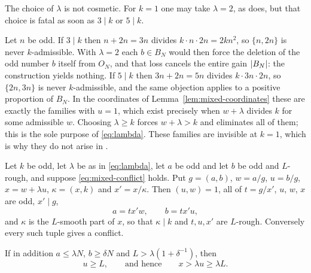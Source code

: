 \documentclass[11pt]{article}
\begin{document}
The choice of \(\lambda\) is not cosmetic. For \(k=1\) one may take
\(\lambda=2\), as \cite{DellaPietra2026} does, but that choice is fatal as
soon as \(3\mid k\) or \(5\mid k\).

\begin{remark}[why \(\lambda=2\) fails]\label{rem:lambda-two}
Let \(n\) be odd. If \(3\mid k\) then \(n+2n=3n\) divides
\(k\cdot n\cdot 2n=2kn^2\), so \(\{n,2n\}\) is never \(k\)-admissible. With
\(\lambda=2\) each \(b\in B_N\) would then force the deletion of the odd
number \(b\) itself from \(O_N\), and that loss cancels the entire gain
\(\left|B_N\right|\): the construction yields nothing. If \(5\mid k\) then
\(3n+2n=5n\) divides \(k\cdot3n\cdot2n\), so \(\{2n,3n\}\) is never
\(k\)-admissible, and the same objection applies to a positive proportion of
\(B_N\). In the coordinates of Lemma~\ref{lem:mixed-coordinates} these are
exactly the families with \(u=1\), which exist precisely when \(w+\lambda\)
divides \(k\) for some admissible \(w\). Choosing \(\lambda\geq k\) forces
\(w+\lambda>k\) and eliminates all of them; this is the sole purpose of
\eqref{eq:lambda}. These families are invisible at \(k=1\), which is why they
do not arise in \cite{DellaPietra2026}.
\end{remark}

\begin{lemma}\label{lem:mixed-coordinates}
Let \(k\) be odd, let \(\lambda\) be as in \eqref{eq:lambda}, let \(a\) be odd
and let \(b\) be odd and \(L\)-rough, and suppose \eqref{eq:mixed-conflict}
holds. Put \(g=(a,b)\), \(w=a/g\), \(u=b/g\), \(x=w+\lambda u\),
\(\kappa=(x,k)\) and \(x'=x/\kappa\). Then \((u,w)=1\), all of \(t=g/x'\),
\(u\), \(w\), \(x\) are odd, \(x'\mid g\),
\begin{equation}\label{eq:mixed-coords}
 a=tx'w,\qquad b=tx'u,
\end{equation}
and \(\kappa\) is the \(L\)-smooth part of \(x\), so that \(\kappa\mid k\) and
\(t,u,x'\) are \(L\)-rough. Conversely every such tuple gives a conflict.

If in addition \(a\leq\lambda N\), \(b\geq\delta N\) and
\(L>\lambda(1+\delta^{-1})\), then
\begin{equation}\label{eq:u-lower}
 u\geq L,\qquad\text{and hence}\qquad x>\lambda u\geq\lambda L .
\end{equation}
\end{lemma}
\end{document}
